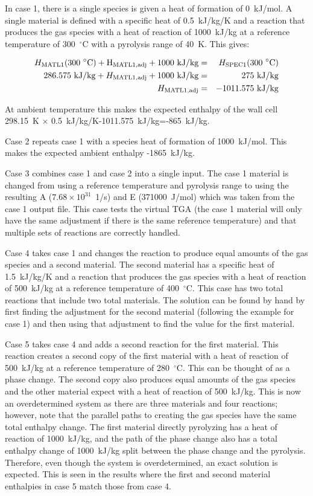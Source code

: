 \documentclass[11pt]{book}
\begin{document}
In case 1, there is a single species is given a heat of formation of 0~\si{kJ/mol}. A single material is defined with a specific heat of 0.5~\si{kJ/kg/K} and a reaction that produces the gas species with a heat of reaction of 1000~\si{kJ/kg} at a reference temperature of 300~$^\circ$C with a pyrolysis range of 40~K.  This gives:

\begin{eqnarray}
   H_{\rm MATL1}(300~^\circ \rm C) + H_{\rm MATL1,adj} + 1000~{\rm kJ/kg} &=& H_{\rm SPEC1}(300~^\circ {\rm C}) \\
   286.575~{\rm kJ/kg} + H_{\rm MATL1,adj}+ 1000~{\rm kJ/kg} &=& 275~{\rm kJ/kg} \\
   H_{\rm MATL1,adj} &=&-1011.575~{\rm kJ/kg}
\end{eqnarray}

At ambient temperature this makes the expected enthalpy of the wall cell 298.15~K $\times$ 0.5~\si{kJ/kg/K}-1011.575~\si{kJ/kg}=-865~\si{kJ/kg}.

Case 2 repeats case 1 with a species heat of formation of 1000~\si{kJ/mol}. This makes the expected ambient enthalpy -1865~\si{kJ/kg}.

Case 3 combines case 1 and case 2 into a single input. The case 1 material is changed from using a reference temperature and pyrolysis range to using the resulting A ($7.68\times10^{31}$~1/s) and E (371000~\si{J/mol}) which was taken from the case 1 output file. This case tests the virtual TGA (the case 1 material will only have the same adjustment if there is the same reference temperature) and that multiple sets of reactions are correctly handled.

Case 4 takes case 1 and changes the reaction to produce equal amounts of the gas species and a second material. The second material has a specific heat of 1.5~\si{kJ/kg/K} and a reaction that produces the gas species with a heat of reaction of 500~\si{kJ/kg} at a reference temperature of 400~$^\circ$C. This case has two total reactions that include two total materials. The solution can be found by hand by first finding the adjustment for the second material (following the example for case 1) and then using that adjustment to find the value for the first material.

Case 5 takes case 4 and adds a second reaction for the first material. This reaction creates a second copy of the first material with a heat of reaction of 500~\si{kJ/kg} at a reference temperature of 280~$^\circ$C. This can be thought of as a phase change. The second copy also produces equal amounts of the gas species and the other material expect with a heat of reaction of 500~\si{kJ/kg}. This is now an overdetermined system as there are three materials and four reactions; however, note that the parallel paths to creating the gas species have the same total enthalpy change. The first material directly pyrolyzing has a heat of reaction of 1000~\si{kJ/kg}, and the path of the phase change also has a total enthalpy change of 1000~\si{kJ/kg} split between the phase change and the pyrolysis. Therefore, even though the system is overdetermined, an exact solution is expected. This is seen in the results where the first and second material enthalpies in case 5 match those from case 4.
\end{document}
